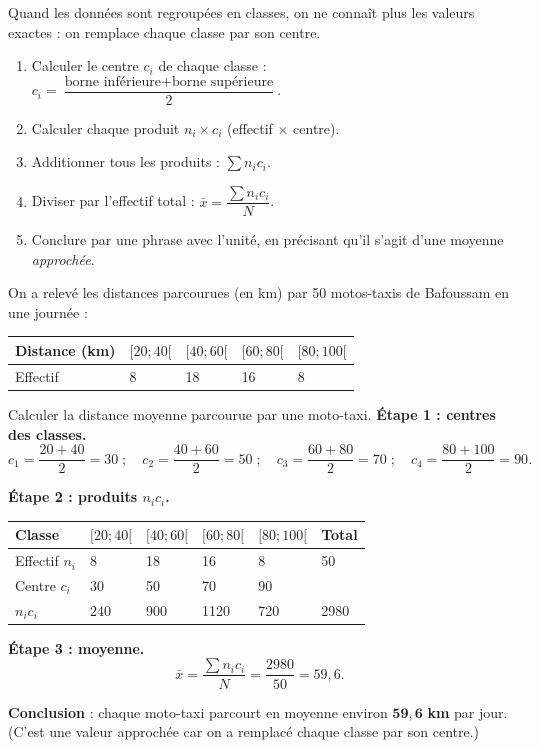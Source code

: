 \documentclass[11pt]{article}
\newcommand{\cle}[1]{{\popxbold\color{popdark}#1}}
\begin{document}
\begin{methode}
Quand les données sont regroupées en classes, on ne connaît plus les valeurs exactes : on remplace chaque classe par son \cle{centre}.
\begin{enumerate}
\item Calculer le \cle{centre} $c_i$ de chaque classe : $c_i = \dfrac{\text{borne inférieure} + \text{borne supérieure}}{2}$.
\item Calculer chaque produit $n_i \times c_i$ (effectif $\times$ centre).
\item Additionner tous les produits : $\sum n_i c_i$.
\item Diviser par l'effectif total : $\bar{x} = \dfrac{\sum n_i c_i}{N}$.
\item Conclure par une phrase avec l'unité, en précisant qu'il s'agit d'une moyenne \emph{approchée}.
\end{enumerate}
\end{methode}

\begin{exoresolu}
On a relevé les distances parcourues (en km) par 50 motos-taxis de Bafoussam en une journée :
\begin{center}
\begin{tabularx}{\linewidth}{|l|X|X|X|X|}\hline
\rowcolor{popblueL} Distance (km) & $[20;40[$ & $[40;60[$ & $[60;80[$ & $[80;100[$ \\ \hline
Effectif & 8 & 18 & 16 & 8 \\ \hline
\end{tabularx}
\end{center}
Calculer la distance moyenne parcourue par une moto-taxi.
\tcblower
\textbf{Étape 1 : centres des classes.}
\[c_1 = \frac{20+40}{2} = 30 \;;\quad c_2 = \frac{40+60}{2} = 50 \;;\quad c_3 = \frac{60+80}{2} = 70 \;;\quad c_4 = \frac{80+100}{2} = 90.\]

\textbf{Étape 2 : produits $n_i c_i$.}
\begin{center}
\begin{tabularx}{\linewidth}{|l|X|X|X|X|X|}\hline
\rowcolor{popblueL} Classe & $[20;40[$ & $[40;60[$ & $[60;80[$ & $[80;100[$ & Total \\ \hline
Effectif $n_i$ & 8 & 18 & 16 & 8 & 50 \\ \hline
Centre $c_i$ & 30 & 50 & 70 & 90 & \\ \hline
$n_i c_i$ & 240 & 900 & 1120 & 720 & 2980 \\ \hline
\end{tabularx}
\end{center}

\textbf{Étape 3 : moyenne.}
\[\bar{x} = \frac{\sum n_i c_i}{N} = \frac{2980}{50} = 59{,}6.\]

\textbf{Conclusion} : chaque moto-taxi parcourt en moyenne environ $\mathbf{59{,}6}$ \textbf{km} par jour. (C'est une valeur approchée car on a remplacé chaque classe par son centre.)
\end{exoresolu}
\end{document}
